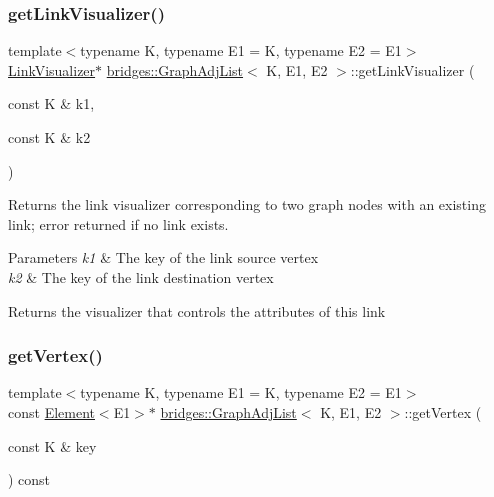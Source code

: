 \subsubsection{\texorpdfstring{get\+Link\+Visualizer()}{getLinkVisualizer()}}
{\footnotesize\ttfamily template$<$typename K, typename E1 = K, typename E2 = E1$>$ \\
\mbox{\hyperlink{classbridges_1_1_link_visualizer}{Link\+Visualizer}}$\ast$ \mbox{\hyperlink{classbridges_1_1_graph_adj_list}{bridges\+::\+Graph\+Adj\+List}}$<$ K, E1, E2 $>$\+::get\+Link\+Visualizer (\begin{DoxyParamCaption}\item[{const K \&}]{k1,  }\item[{const K \&}]{k2 }\end{DoxyParamCaption})\hspace{0.3cm}{\ttfamily [inline]}}

Returns the link visualizer corresponding to two graph nodes with an existing link; error returned if no link exists.


\begin{DoxyParams}{Parameters}
{\em k1} & The key of the link source vertex \\
\hline
{\em k2} & The key of the link destination vertex\\
\hline
\end{DoxyParams}
\begin{DoxyReturn}{Returns}
the visualizer that controls the attributes of this link 
\end{DoxyReturn}
\mbox{\label{classbridges_1_1_graph_adj_list_a9a222bfc1d37f459caac60508b816fb6}} 
\subsubsection{\texorpdfstring{get\+Vertex()}{getVertex()}\hspace{0.1cm}{\footnotesize\ttfamily [1/2]}}
{\footnotesize\ttfamily template$<$typename K, typename E1 = K, typename E2 = E1$>$ \\
const \mbox{\hyperlink{classbridges_1_1_element}{Element}}$<$E1$>$$\ast$ \mbox{\hyperlink{classbridges_1_1_graph_adj_list}{bridges\+::\+Graph\+Adj\+List}}$<$ K, E1, E2 $>$\+::get\+Vertex (\begin{DoxyParamCaption}\item[{const K \&}]{key }\end{DoxyParamCaption}) const\hspace{0.3cm}{\ttfamily [inline]}}

